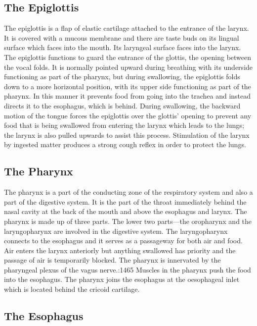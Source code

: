 \hypertarget{the-epiglottis}{%
\subsection{The Epiglottis}\label{the-epiglottis}}

The epiglottis is a flap of elastic cartilage attached to the entrance of the larynx. It is covered with a mucous membrane and there are taste buds on its lingual surface which faces into the mouth. Its laryngeal surface faces into the larynx. The epiglottis functions to guard the entrance of the glottis, the opening between the vocal folds. It is normally pointed upward during breathing with its underside functioning as part of the pharynx, but during swallowing, the epiglottis folds down to a more horizontal position, with its upper side functioning as part of the pharynx. In this manner it prevents food from going into the trachea and instead directs it to the esophagus, which is behind. During swallowing, the backward motion of the tongue forces the epiglottis over the glottis' opening to prevent any food that is being swallowed from entering the larynx which leads to the lungs; the larynx is also pulled upwards to assist this process. Stimulation of the larynx by ingested matter produces a strong cough reflex in order to protect the lungs.

\hypertarget{the-pharynx}{%
\subsection{The Pharynx}\label{the-pharynx}}

The pharynx is a part of the conducting zone of the respiratory system and also a part of the digestive system. It is the part of the throat immediately behind the nasal cavity at the back of the mouth and above the esophagus and larynx. The pharynx is made up of three parts. The lower two parts---the oropharynx and the laryngopharynx are involved in the digestive system. The laryngopharynx connects to the esophagus and it serves as a passageway for both air and food. Air enters the larynx anteriorly but anything swallowed has priority and the passage of air is temporarily blocked. The pharynx is innervated by the pharyngeal plexus of the vagus nerve.:1465 Muscles in the pharynx push the food into the esophagus. The pharynx joins the esophagus at the oesophageal inlet which is located behind the cricoid cartilage.

\hypertarget{the-esophagus}{%
\subsection{The Esophagus}\label{the-esophagus}}

